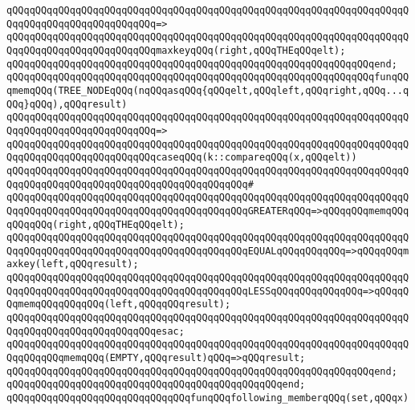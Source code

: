 \verb|qQQqqQQqqQQqqQQqqQQqqQQqqQQqqQQqqQQqqQQqqQQqqQQqqQQqqQQqqQQqqQQqqQQqqQQqqQQqqQQqqQQqqQQqqQQqqQQq=>|\newline
\verb|qQQqqQQqqQQqqQQqqQQqqQQqqQQqqQQqqQQqqQQqqQQqqQQqqQQqqQQqqQQqqQQqqQQqqQQqqQQqqQQqqQQqqQQqqQQqqQQqmaxkeyqQQq(right,qQQqTHEqQQqelt);|\newline
\verb|qQQqqQQqqQQqqQQqqQQqqQQqqQQqqQQqqQQqqQQqqQQqqQQqqQQqqQQqqQQqqQQqend;|\newline
\newline
\verb|qQQqqQQqqQQqqQQqqQQqqQQqqQQqqQQqqQQqqQQqqQQqqQQqqQQqqQQqqQQqqQQqfunqQQqmemqQQq(TREE_NODEqQQq(nqQQqasqQQq{qQQqelt,qQQqleft,qQQqright,qQQq...qQQq}qQQq),qQQqresult)|\newline
\verb|qQQqqQQqqQQqqQQqqQQqqQQqqQQqqQQqqQQqqQQqqQQqqQQqqQQqqQQqqQQqqQQqqQQqqQQqqQQqqQQqqQQqqQQqqQQqqQQq=>|\newline
\verb|qQQqqQQqqQQqqQQqqQQqqQQqqQQqqQQqqQQqqQQqqQQqqQQqqQQqqQQqqQQqqQQqqQQqqQQqqQQqqQQqqQQqqQQqqQQqqQQqcaseqQQq(k::compareqQQq(x,qQQqelt))|\newline
\verb|qQQqqQQqqQQqqQQqqQQqqQQqqQQqqQQqqQQqqQQqqQQqqQQqqQQqqQQqqQQqqQQqqQQqqQQqqQQqqQQqqQQqqQQqqQQqqQQqqQQqqQQqqQQqqQQq#|\newline
\verb|qQQqqQQqqQQqqQQqqQQqqQQqqQQqqQQqqQQqqQQqqQQqqQQqqQQqqQQqqQQqqQQqqQQqqQQqqQQqqQQqqQQqqQQqqQQqqQQqqQQqqQQqqQQqqQQqGREATERqQQq=>qQQqqQQqmemqQQqqQQqqQQq(right,qQQqTHEqQQqelt);|\newline
\verb|qQQqqQQqqQQqqQQqqQQqqQQqqQQqqQQqqQQqqQQqqQQqqQQqqQQqqQQqqQQqqQQqqQQqqQQqqQQqqQQqqQQqqQQqqQQqqQQqqQQqqQQqqQQqqQQqEQUALqQQqqQQqqQQq=>qQQqqQQqmaxkey(left,qQQqresult);|\newline
\verb|qQQqqQQqqQQqqQQqqQQqqQQqqQQqqQQqqQQqqQQqqQQqqQQqqQQqqQQqqQQqqQQqqQQqqQQqqQQqqQQqqQQqqQQqqQQqqQQqqQQqqQQqqQQqqQQqLESSqQQqqQQqqQQqqQQq=>qQQqqQQqmemqQQqqQQqqQQq(left,qQQqqQQqresult);|\newline
\verb|qQQqqQQqqQQqqQQqqQQqqQQqqQQqqQQqqQQqqQQqqQQqqQQqqQQqqQQqqQQqqQQqqQQqqQQqqQQqqQQqqQQqqQQqqQQqqQQqesac;|\newline
\newline
\verb|qQQqqQQqqQQqqQQqqQQqqQQqqQQqqQQqqQQqqQQqqQQqqQQqqQQqqQQqqQQqqQQqqQQqqQQqqQQqqQQqmemqQQq(EMPTY,qQQqresult)qQQq=>qQQqresult;|\newline
\verb|qQQqqQQqqQQqqQQqqQQqqQQqqQQqqQQqqQQqqQQqqQQqqQQqqQQqqQQqqQQqqQQqend;|\newline
\verb|qQQqqQQqqQQqqQQqqQQqqQQqqQQqqQQqqQQqqQQqqQQqqQQqend;|\newline
\verb|qQQqqQQqqQQqqQQqqQQqqQQqqQQqqQQqfunqQQqfollowing_memberqQQq(set,qQQqx)|\newline
